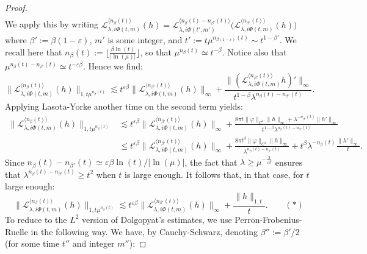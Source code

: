 \documentclass[11pt]{amsart}
\theoremstyle{plain}
\theoremstyle{definition}
\numberwithin{equation}{section}
\begin{document}
\begin{proof}
\begin{align*}
\end{align*}
We apply this by writing $\mathcal{L}_{\lambda,i\Phi(t,m)}^{\langle n_\beta(t) \rangle }(h) = \mathcal{L}_{\lambda,i\Phi(t',m')}^{\langle n_{\beta}(t)-n_{\beta'}(t) \rangle}\big( \mathcal{L}_{\lambda,i\Phi(t,m)}^{\langle n_{\beta'}(t) \rangle}(h) \big) $ where $\beta' := \beta(1-\varepsilon)$, $m'$ is some integer, and $t' := t \mu^{n_{\beta(1-\varepsilon)}(t)} \sim t^{1-\beta'}$. We recall here that  $n_\beta(t) := \Big\lfloor \frac{\beta \ln(t)}{|\ln(\mu)|} \Big\rfloor $, so that $\mu^{n_\beta(t)} \simeq t^{-\beta}$. Notice also that $\mu^{n_{\beta}(t)-n_{\beta'}(t)} \simeq t^{-\varepsilon \beta}$. Hence we find:
$$ \|\mathcal{L}_{\lambda,i\Phi(t,m)}^{\langle n_\beta(t) \rangle}(h)\|_{1,t \mu^{n_\beta(t)}} \lesssim t^{\varepsilon \beta} \| \mathcal{L}_{\lambda,i\Phi(t,m)}^{\langle n_{\beta'}(t) \rangle}(h) \|_\infty + \frac{\|(\mathcal{L}_{\lambda,i\Phi(t,m)}^{\langle n_{\beta'}(t) \rangle}h)' \|_\infty}{t^{1-\beta} \lambda^{n_\beta(t) - n_{\beta'}(t)}}. $$
Applying Lasota-Yorke another time on the second term yields:
\begin{align*}\|\mathcal{L}_{\lambda,i\Phi(t,m)}^{{\langle n_\beta(t) \rangle}}(h)\|_{1,t \mu^{n_\beta(t)}} &\lesssim t^{\varepsilon \beta} \| \mathcal{L}_{\lambda,i\Phi(t,m)}^{\langle n_{\beta'}(t) \rangle}(h) \|_\infty + \frac{8 \pi t \| \varphi \|_{C^1} \|h\|_\infty + \lambda^{-n_{\beta'}(t)}\| h' \|_\infty}{t^{1-\beta} \lambda^{n_\beta(t) - n_{\beta'}(t)}} \\
 &\leq t^{\varepsilon \beta} \| \mathcal{L}_{\lambda,i\Phi(t,m)}^{\langle n_{\beta'}(t) \rangle}(h) \|_\infty + \frac{8 \pi t^\beta \| \varphi \|_{C^1} \|h\|_\infty }{ \lambda^{n_\beta(t) - n_{\beta'}(t)}} + t^{\beta} \lambda^{- n_\beta(t)} \frac{ \| h' \|_\infty}{t} .
\end{align*}
Since $n_\beta(t) - n_{\beta'}(t) \simeq \varepsilon \beta \ln(t)/|\ln(\mu)| $, the fact that $\lambda \geq  \mu^{-\frac{3}{\varepsilon \beta} }$ ensures that $\lambda^{n_\beta(t) - n_{\beta'}(t)} \geq t^{2}$ when $t$ is large enough. It follows that, in that case, for $t$ large enough:
$$ \|\mathcal{L}_{\lambda,i\Phi(t,m)}^{\langle n_\beta(t) \rangle}(h)\|_{1,t \mu^{n_\beta(t)}} \lesssim t^{\varepsilon \beta} \| \mathcal{L}_{\lambda,i\Phi(t,m)}^{\langle n_{\beta'}(t) \rangle}(h) \|_\infty + \frac{\|h\|_{1,t}}{t}.  \quad \quad (*) $$
To reduce to the $L^2$ version of Dolgopyat's estimates, we use Perron-Frobenius-Ruelle in the following way. We have, by Cauchy-Schwarz, denoting $\beta'':=\beta'/2$ (for some time $t''$ and integer $m''$):

\end{proof}
\end{document}
